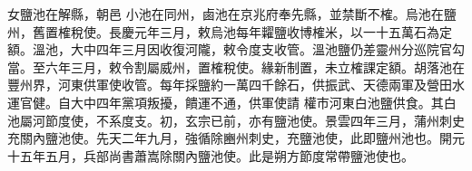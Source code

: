 \begin{pinyinscope}
 女鹽池在解縣，朝邑
 小池在同州，鹵池在京兆府奉先縣，並禁斷不榷。烏池在鹽州，舊置榷稅使。長慶元年三月，敕烏池每年糶鹽收博榷米，以一十五萬石為定額。溫池，大中四年三月因收復河隴，敕令度支收管。溫池鹽仍差靈州分巡院官勾當。至六年三月，敕令割屬威州，置榷稅使。緣新制置，未立榷課定額。胡落池在豐州界，河東供軍使收管。每年採鹽約一萬四千餘石，供振武、天德兩軍及營田水運官健。自大中四年黨項叛擾，饋運不通，供軍使請
 權市河東白池鹽供食。其白池屬河節度使，不系度支。初，玄宗已前，亦有鹽池使。景雲四年三月，蒲州刺史充關內鹽池使。先天二年九月，強循除豳州刺史，充鹽池使，此即鹽州池也。開元十五年五月，兵部尚書蕭嵩除關內鹽池使。此是朔方節度常帶鹽池使也。



\end{pinyinscope}